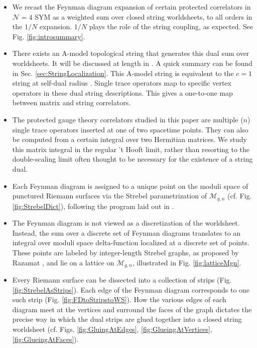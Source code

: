 \documentclass[english]{article}
\renewcommand{\>}{\rangle}
\newcommand{\<}{\langle}
\renewcommand{\(}{\left(}
\renewcommand{\)}{\right)}
\begin{document}
\begin{itemize}
    \item We recast the Feynman diagram expansion of certain protected correlators in $\mathcal{N}=4$ SYM as a weighted sum over closed string worldsheets, to all orders in the $1/N$ expansion. $1/N$ plays the role of the string coupling, as expected. See Fig. \ref{fig:introsummary}.
    \item There exists an A-model topological string that generates this dual sum over worldsheets. It will be discussed at length in \cite{DSDIII}. A quick summary can be found in Sec. \ref{sec:StringLocalization}. This A-model string is equivalent to the $c=1$ string at self-dual radius \cite{MukhiVafa,ashok2006topological}. Single trace operators map to specific vertex operators in these dual string descriptions. This gives a one-to-one map between matrix and string correlators.
    
     \item The protected gauge theory correlators studied in this paper are multiple ($n$) single trace operators inserted at one of two spacetime points. They can also be computed from a certain integral over two Hermitian matrices. We study this matrix integral in the regular 't Hooft limit, rather than resorting to the double-scaling limit often thought to be necessary for the existence of a string dual.
     
    \item Each Feynman diagram is assigned to a unique point on the moduli space of punctured Riemann surfaces via the Strebel parametrization of $\mathcal{M}_{g,n}$ (cf. Fig. \ref{fig:StrebelDict}), following the program laid out in \cite{freefieldsadsI,freefieldsadsII,freefieldsIII}.
    
    \item  The Feynman diagram is not viewed as a discretization of the worldsheet. Instead, the sum over a discrete set of Feynman diagrams translates to an integral over moduli space delta-function localized at a discrete set of points. These points are labeled by integer-length Strebel graphs, as proposed by Razamat \cite{razamatGauss}, and lie on a lattice on $\mathcal{M}_{g,n}$, illustrated in Fig. \ref{fig:latticeMgn}.
    
    \item Every Riemann surface can be dissected into a collection of strips (Fig. \ref{fig:StrebelAsStrips}). Each edge of the Feynman diagram corresponds to one such strip (Fig. \ref{fig:FDtoStripstoWS}). How the various edges of each diagram meet at the vertices and surround the faces of the graph dictates the precise way in which the dual strips are glued together into a closed string worldsheet (cf. Figs. \ref{fig:GluingAtEdges}, \ref{fig:GlueingAtVertices}, \ref{fig:GlueingAtFaces}). 
    

\end{itemize}
\end{document}
